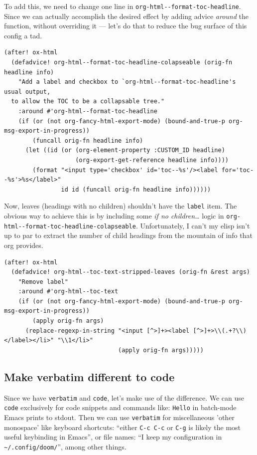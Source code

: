 \documentclass[11pt]{article}
\begin{document}
To add this, we need to change one line in
\texttt{org-html-{}-{}format-toc-headline}. Since we can actually accomplish
the desired effect by adding advice \emph{around} the function, without
overriding it --- let's do that to reduce the bug surface of this
config a tad.
\begin{verbatim}
(after! ox-html
  (defadvice! org-html--format-toc-headline-colapseable (orig-fn headline info)
    "Add a label and checkbox to `org-html--format-toc-headline's usual output,
  to allow the TOC to be a collapsable tree."
    :around #'org-html--format-toc-headline
    (if (or (not org-fancy-html-export-mode) (bound-and-true-p org-msg-export-in-progress))
        (funcall orig-fn headline info)
      (let ((id (or (org-element-property :CUSTOM_ID headline)
                    (org-export-get-reference headline info))))
        (format "<input type='checkbox' id='toc--%s'/><label for='toc--%s'>%s</label>"
                id id (funcall orig-fn headline info))))))
\end{verbatim}
Now, leaves (headings with no children) shouldn't have the \texttt{label} item. The
obvious way to achieve this is by including some \emph{if no children\ldots{}} logic in
\texttt{org-html-{}-{}format-toc-headline-colapseable}. Unfortunately, I can't my elisp isn't
up to par to extract the number of child headings from the mountain of info that
org provides.
\begin{verbatim}
(after! ox-html
  (defadvice! org-html--toc-text-stripped-leaves (orig-fn &rest args)
    "Remove label"
    :around #'org-html--toc-text
    (if (or (not org-fancy-html-export-mode) (bound-and-true-p org-msg-export-in-progress))
        (apply orig-fn args)
      (replace-regexp-in-string "<input [^>]+><label [^>]+>\\(.+?\\)</label></li>" "\\1</li>"
                                (apply orig-fn args)))))
\end{verbatim}
\subsection{Make verbatim different to code}
\label{sec:org151ae31}
Since we have \texttt{verbatim} and \texttt{code}, let's make use of the difference. We can use \texttt{code} exclusively for code snippets and commands like: \texttt{Hello} in batch-mode Emacs prints to stdout. Then we can use \texttt{verbatim} for miscellaneous 'other monospace' like keyboard shortcuts: ``either \texttt{C-c C-c} or \texttt{C-g} is likely the most useful keybinding in Emacs'', or file names: ``I keep my configuration in \texttt{\textasciitilde{}/.config/doom/}'', among other things.
\end{document}
